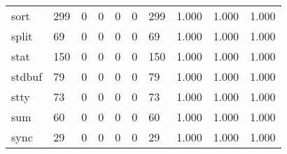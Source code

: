 \begin{longtable}{lp{1.3cm}p{1.3cm}p{1.3cm}p{1.3cm}p{1.3cm}p{1.3cm}p{1.3cm}p{1.3cm}p{1.3cm}}
sort      &                    299 &                                             0 &                                            0 &                                           0 &                                            0 &                                        299 &                                1.000 &                                  1.000 &                                1.000 \\
split     &                     69 &                                             0 &                                            0 &                                           0 &                                            0 &                                         69 &                                1.000 &                                  1.000 &                                1.000 \\
stat      &                    150 &                                             0 &                                            0 &                                           0 &                                            0 &                                        150 &                                1.000 &                                  1.000 &                                1.000 \\
stdbuf    &                     79 &                                             0 &                                            0 &                                           0 &                                            0 &                                         79 &                                1.000 &                                  1.000 &                                1.000 \\
stty      &                     73 &                                             0 &                                            0 &                                           0 &                                            0 &                                         73 &                                1.000 &                                  1.000 &                                1.000 \\
sum       &                     60 &                                             0 &                                            0 &                                           0 &                                            0 &                                         60 &                                1.000 &                                  1.000 &                                1.000 \\
sync      &                     29 &                                             0 &                                            0 &                                           0 &                                            0 &                                         29 &                                1.000 &                                  1.000 &                                1.000 \\

\end{longtable}
